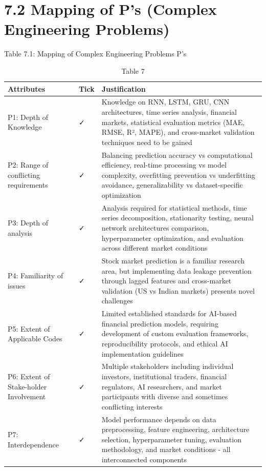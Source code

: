 \documentclass[12pt,a4paper]{report}
\begin{document}
\section{7.2 Mapping of P's (Complex Engineering Problems)}
Table 7.1: Mapping of Complex Engineering Problems P’s

\begin{table}[htbp]
\centering
\begin{tabular}{|l|l|l|}
\hline
\textbf{Attributes} & \textbf{Tick} & \textbf{Justification} \\
\hline
P1: Depth of Knowledge & ✓ & Knowledge on RNN, LSTM, GRU, CNN architectures, time series analysis, financial markets, statistical evaluation metrics (MAE, RMSE, R², MAPE), and cross-market validation techniques need to be gained \\
\hline
P2: Range of conflicting requirements & ✓ & Balancing prediction accuracy vs computational efficiency, real-time processing vs model complexity, overfitting prevention vs underfitting avoidance, generalizability vs dataset-specific optimization \\
\hline
P3: Depth of analysis & ✓ & Analysis required for statistical methods, time series decomposition, stationarity testing, neural network architectures comparison, hyperparameter optimization, and evaluation across different market conditions \\
\hline
P4: Familiarity of issues & ✓ & Stock market prediction is a familiar research area, but implementing data leakage prevention through lagged features and cross-market validation (US vs Indian markets) presents novel challenges \\
\hline
P5: Extent of Applicable Codes & ✓ & Limited established standards for AI-based financial prediction models, requiring development of custom evaluation frameworks, reproducibility protocols, and ethical AI implementation guidelines \\
\hline
P6: Extent of Stake-holder Involvement & ✓ & Multiple stakeholders including individual investors, institutional traders, financial regulators, AI researchers, and market participants with diverse and sometimes conflicting interests \\
\hline
P7: Interdependence & ✓ & Model performance depends on data preprocessing, feature engineering, architecture selection, hyperparameter tuning, evaluation methodology, and market conditions - all interconnected components \\
\hline
\end{tabular}
\caption{Table 7}
\label{tab:table7}
\end{table}
\end{document}
